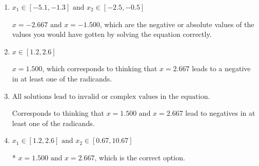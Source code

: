 \documentclass{extbook}[14pt]
\begin{document}
\begin{enumerate}
{\begin{enumerate}[label=\Alph*.]
$x = 2.667$, which corresponds to thinking that $x = 1.500$ leads to a negative in at least one of the radicands.
\item \( x_1 \in [-5.1, -1.3] \text{ and } x_2 \in [-2.5,-0.5] \)

$x = -2.667 \text{ and } x = -1.500$, which are the negative or absolute values of the values you would have gotten by solving the equation correctly.
\item \( x \in [1.2,2.6] \)

$x = 1.500$, which corresponds to thinking that $x = 2.667$ leads to a negative in at least one of the radicands.
\item \( \text{All solutions lead to invalid or complex values in the equation.} \)

Corresponds to thinking that $x = 1.500 \text{ and } x = 2.667$ lead to negatives in at least one of the radicands.
\item \( x_1 \in [1.2, 2.6] \text{ and } x_2 \in [0.67,10.67] \)

* $x = 1.500 \text{ and } x = 2.667$, which is the correct option.
\end{enumerate}

}
\end{enumerate}
\end{document}
